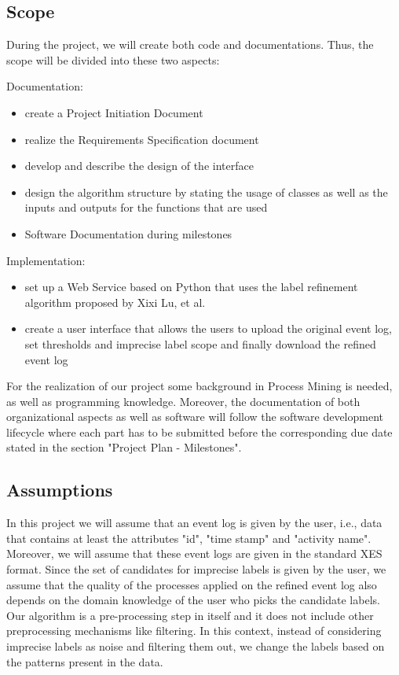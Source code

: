 \documentclass[notitlepage]{article}
\begin{document}
\begin{flushleft}
\subsection{Scope}

During the project, we will create both code and documentations. Thus, the scope will be divided into these two aspects:

Documentation: 
\begin{itemize}
	\item create a Project Initiation Document 
	\item realize the Requirements Specification document
	\item develop and describe the design of the interface 
	\item design the algorithm structure by stating the usage of classes as well as the inputs and outputs for the functions that are used
	\item Software Documentation during milestones
\end{itemize} 


Implementation:
\begin{itemize}
	\item set up a Web Service based on Python that uses the label refinement algorithm proposed by Xixi Lu, et al.
	\item create a user interface that allows the users to upload the original event log, set thresholds and imprecise label scope and finally download the refined event log
\end{itemize}

For the realization of our project some background in Process Mining is needed, as well as programming knowledge.
Moreover, the documentation of both organizational aspects as well as software will follow the software development lifecycle where each part has to be submitted before the corresponding due date stated in the section "Project Plan - Milestones".


\subsection{Assumptions}

In this project we will assume that an event log is given by the user, i.e., data that contains at least the attributes "id", "time stamp" and "activity name". Moreover, we will assume that these event logs are given in the standard XES format.
Since the set of candidates for imprecise labels is given by the user, we assume that the quality of the processes applied on the refined event log also depends on the domain knowledge of the user who picks the candidate labels.
Our algorithm is a pre-processing step in itself and it does not include other preprocessing mechanisms like filtering.
In this context, instead of considering imprecise labels as noise and filtering them out, we change the labels based on the patterns present in the data.




\end{flushleft}
\end{document}

